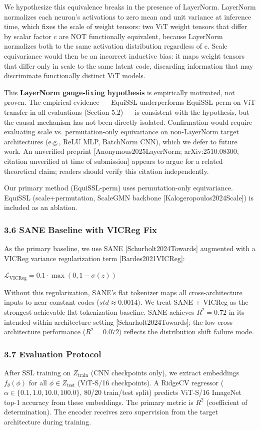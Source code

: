 We hypothesize this equivalence breaks in the presence of LayerNorm. LayerNorm normalizes each neuron's activations to zero mean and unit variance at inference time, which fixes the scale of weight tensors: two ViT weight tensors that differ by scalar factor c are NOT functionally equivalent, because LayerNorm normalizes both to the same activation distribution regardless of c. Scale equivariance would then be an incorrect inductive bias: it maps weight tensors that differ only in scale to the same latent code, discarding information that may discriminate functionally distinct ViT models.

This \textbf{LayerNorm gauge-fixing hypothesis} is empirically motivated, not proven. The empirical evidence --- EquiSSL underperforms EquiSSL-perm on ViT transfer in all evaluations (Section 5.2) --- is consistent with the hypothesis, but the causal mechanism has not been directly isolated. Confirmation would require evaluating scale vs. permutation-only equivariance on non-LayerNorm target architectures (e.g., ReLU MLP, BatchNorm CNN), which we defer to future work. An unverified preprint [Anonymous2025LayerNorm; arXiv:2510.08300, citation unverified at time of submission] appears to argue for a related theoretical claim; readers should verify this citation independently.

Our primary method (EquiSSL-perm) uses permutation-only equivariance. EquiSSL (scale+permutation, ScaleGMN backbone [Kalogeropoulos2024Scale]) is included as an ablation.

\subsubsection{3.6 SANE Baseline with VICReg Fix}

As the primary baseline, we use SANE [Schurholt2024Towards] augmented with a VICReg variance regularization term [Bardes2021VICReg]:

$\mathcal{L}_\text{VICReg} = 0.1 \cdot \max(0, 1 - \sigma(z))$

Without this regularization, SANE's flat tokenizer maps all cross-architecture inputs to near-constant codes ($std\approx 0.0014)$. We treat SANE + VICReg as the strongest achievable flat tokenization baseline. SANE achieves $R^{2}=0.72$ in its intended within-architecture setting [Schurholt2024Towards]; the low cross-architecture performance ($R^{2}=0.072)$ reflects the distribution shift failure mode.

\subsubsection{3.7 Evaluation Protocol}

After SSL training on $Z_\text{train}$ (CNN checkpoints only), we extract embeddings $f_\theta(\phi)$ for all $\phi \in Z_\text{test}$ (ViT-S/16 checkpoints). A RidgeCV regressor ($\alpha \in \{0.1, 1.0, 10.0, 100.0\}$, 80/20 train/test split) predicts ViT-S/16 ImageNet top-1 accuracy from these embeddings. The primary metric is $R^2$ (coefficient of determination). The encoder receives zero supervision from the target architecture during training.

